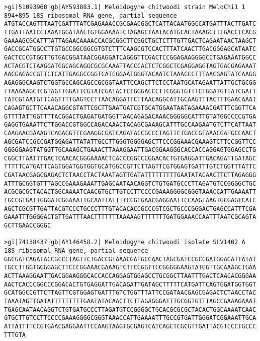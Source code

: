 \documentclass[11pt]{article}
\begin{document}
\begin{Verbatim}[commandchars=\\\{\}]
>gi|51093968|gb|AY593883.1| Meloidogyne chitwoodi strain MeloChi1 1 894+895 18S ribosomal RNA gene, partial sequence
ATGTACCAGTTTAATCGATTTATCGAGAAACCGCGAACGGCTCATTACAATGGCCATGATTTACTTGATC
TTGATTAATCCTAAATGGATAACTGTGGAAAATCTAGAGCTAATACATGCACTAAAGCTTTGACCTCACG
GAAAAGCGCATTTATTAGAACAAAACCACGCGGCTTCGGCTGCTCTTTGTTGACTCAGAATAACTAAGCT
GACCGCATGGCCTTGTGCCGGCGGCGTGTCTTTCAAGCGTCCACTTTATCAACTTGACGGGAGCATAATC
GACTCCCGTGGTTGTGACGGATAACGGAGGATCAGGGTTCGACTCCGGAGAAGGGGCCTGAGAAATGGCC
ACTACGTCTAAGGATGGCAGCAGGCGCGCAAATTACCCACTCTCGGCTCGAGGAGGTAGTGACGAGAAAT
AACGAGACCGTTCTCATTGAGGCCGGTCATCGGAATGGGTACAATCTAAACCCTTTAACGAGTATCAAGG
AGAGGGCAAGTCTGGTGCCAGCAGCCGCGGTAATTCCAGCTTCTCCTAATGCATAGAATTATTGCTGCGG
TTAAAAAGCTCGTAGTTGGATTCGTATCGATACTCTGGGACCCTTCGGGTGTTTCTGGATGTTATCGATT
TATCGTAATGTTCAGTTTTGAGTCCTTAACAGGATTCTTAACAGGCATTGCAAGTTTACTTTGAACAAAT
CAGAGTGCTTCAAACAGGCGTATTCGCTTGAATGATCGTGCATGGAATAATAGAAAACGATTTCGGTTCA
GTTTTATTGGTTTTACGGACTGAGATGATGGTTAACAGAGACAAACGGGGGCATTTGTATGGCCCCGTGA
GAGGTGAAATTCTTGGACCGTGGCCAGACAAACTACAGCGAAAGCATTTGCCAAGAATGTCTTCATTAAT
CAAGAACGAAAGTCAGAGGTTCGAAGGCGATCAGATACCGCCCTAGTTCTGACCGTAAACGATGCCAACT
AGCGATCCGCCGATGGAGATTATATTGCCTTGGGTGGGGAGCTTCCCGGAAACGAAAGTCTTCCGGTTCC
GGGGGAAGTATGGTTGCAAAGCTGAAACTTAAAGGAATTGACGGAAGGGCACCACCAGGAGTGGAGCCTG
CGGCTTAATTTGACTCAACACGGGAAAACTCACCCGGCCCGGACACTGTGAGGATTGACAGATTGATAGC
TTTTTCATGATTCAGTGGATGGTGGTGCATGGCCGTTCTTAGTTCGTGGAGTGATTTGTCTGGTTTATTC
CGATAACGAGCGAGACTCTAACCTACTAAATAGTTGATATTTTTTTTTGAATATACAACTTCTTAGAGGG
ATTTGCGGTGTTTAGCCGAAAGAAATTGAGCAATAACAGGTCTGTGATGCCCTTAGATGTCCGGGGCTGC
ACGCGCGCTACACTGGCAAAATCAACGTGCTTGTCCTTCCCCGAAAGGGGCGGGTAAACCATTGAAAATT
TGCCGTGATTGGGATCGGAAATTGCAATTATTTTCCGTGAACGAGGAATTCCAAGTAAGTGCGAGTCATC
AGCTCGCGTTGATTACGTCCCTGCCCTTTGTACACACCGCCCGTCGCTGCCCGGGACTGAGCCATTTCGA
GAAATTTGGGGACTGTTGATTTAACTTTTTTTAAAAAGTTTTTTTGATGGAAACCAATTTAATCGCAGTA
GCTTGAACCGGGC

>gi|74138437|gb|AY146458.2| Meloidogyne chitwoodi isolate SLV1402 A 18S ribosomal RNA gene, partial sequence
GGCGATCAGATACCGCCCTAGTTCTGACCGTAAACGATGCCAACTAGCGATCCGCCGATGGAGATTATAT
TGCCTTGGTGGGGAGCTTCCCGGAAACGAAAGTCTTCCGGTTCCGGGGGAAGTATGGTTGCAAAGCTGAA
ACTTAAAGGAATTGACGGAAGGGCACCACCAGGAGTGGAGCCTGCGGCTTAATTTGACTCAACACGGGAA
AACTCACCCGGCCCGGACACTGTGAGGATTGACAGATTGATAGCTTTTTCATGATTCAGTGGATGGTGGT
GCATGGCCGTTCTTAGTTCGTGGAGTGATTTGTCTGGTTTATTCCGATAACGAGCGAGACTCTAACCTAC
TAAATAGTTGATATTTTTTTTTGAATATACAACTTCTTAGAGGGATTTGCGGTGTTTAGCCGAAAGAAAT
TGAGCAATAACAGGTCTGTGATGCCCTTAGATGTCCGGGGCTGCACGCGCGCTACACTGGCAAAATCAAC
GTGCTTGTCCTTCCCCGAAAGGGGCGGGTAAACCATTGAAAATTTGCCGTGATTGGGATCGGAAATTGCA
ATTATTTTCCGTGAACGAGGAATTCCAAGTAAGTGCGAGTCATCAGCTCGCGTTGATTACGTCCCTGCCC
TTTGTA


\end{Verbatim}
\end{document}
